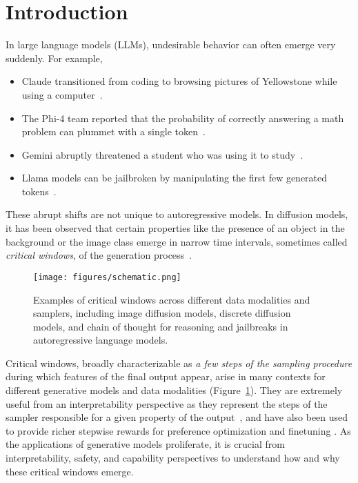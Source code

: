 \section{Introduction}\label{sec:intro}

In large language models (LLMs), undesirable behavior can often emerge very suddenly. For example,
\begin{itemize}
    \item Claude transitioned from coding to browsing pictures of Yellowstone while using a computer~\citep{anthropicyellowstone}.
    \item The Phi-4 team reported that the probability of correctly answering a math problem can plummet with a single token~\citep{abdin2024phi4technicalreport,lin2024criticaltokensmattertokenlevel}.
    \item Gemini abruptly threatened a student who was using it to study~\citep{geminijailbreak}.
    \item Llama models can be jailbroken by manipulating the first few generated tokens~\citep{qi2024safetyalignmentjusttokens,prefillingattack}.
\end{itemize} 
These abrupt shifts are not unique to autoregressive models. In diffusion models, it has been observed that certain properties like the presence of an object in the background or the image class emerge in narrow time intervals, sometimes called \emph{critical windows}, of the generation process~\citep{ho2020denoising,meng2022sdedit,9879163,raya2023spontaneous,georgiev2023journey,sclocchi2024probinglatenthierarchicalstructure,sclocchi2024phasetransitiondiffusionmodels,biroli2024dynamical,li2024criticalwindowsnonasymptotictheory}. 
\begin{figure}[H]
    \centering
        \texttt{[image: figures/schematic.png]}
    \caption{Examples of critical windows across different data modalities and samplers, including image diffusion models, discrete diffusion models, and chain of thought for reasoning and jailbreaks in autoregressive language models.}
    \label{fig:schematic-diagram}
\end{figure}
Critical windows, broadly characterizable as \emph{a few steps of the sampling procedure} during which features of the final output appear, arise in many contexts for different generative models and data modalities (Figure~\ref{fig:schematic-diagram}). They are extremely useful from an interpretability perspective as they represent the steps of the sampler responsible for a given property of the output~\citep{georgiev2023journey,qi2024safetyalignmentjusttokens}, and have also been used to provide richer stepwise rewards for preference optimization and finetuning  \citep{abdin2024phi4technicalreport,lin2024criticaltokensmattertokenlevel,qi2024safetyalignmentjusttokens}. As the applications of generative models proliferate, it is crucial from interpretability, safety, and capability perspectives to understand how and why these critical windows emerge. 

